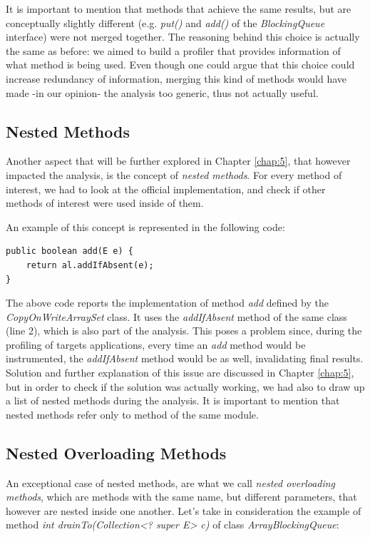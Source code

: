 \documentclass[]{usiinfthesis}
\begin{document}
 \noindent
 It is important to mention that methods that achieve the same results, but are conceptually slightly different (e.g. \textit{put()} and \textit{add()} of the \textit{BlockingQueue} interface) were not merged together. The reasoning behind this choice is actually the same as before: we aimed to build a profiler that provides information of what method is being used. Even though one could argue that this choice could increase redundancy of information, merging this kind of methods would have made -in our opinion- the analysis too generic, thus not actually useful.
 
 \subsection{Nested Methods} \label{sec:4.2.3}
 Another aspect that will be further explored in Chapter \ref{chap:5}, that however impacted the analysis, is the concept of \emph{nested methods}. For every method of interest, we had to look at the official implementation, and check if other methods of interest were used inside of them.
 
 \noindent
 An example of this concept is represented in the following code:
 
\begin{verbatim}
public boolean add(E e) {
    return al.addIfAbsent(e);
}
\end{verbatim}

\noindent
The above code reports the implementation of method \textit{add} defined by the \textit{CopyOnWriteArraySet} class. It uses the \textit{addIfAbsent} method of the same class (line 2), which is also part of the analysis. This poses a problem since, during the profiling of targets applications, every time an \textit{add} method would be instrumented, the \textit{addIfAbsent} method would be as well, invalidating final results. Solution and further explanation of this issue are discussed in Chapter \ref{chap:5}, but in order to check if the solution was actually working, we had also to draw up a list of nested methods during the analysis. It is important to mention that nested methods refer only to method of the same module.

 
 \subsection{Nested Overloading Methods}
 An exceptional case of nested methods, are what we call \textit{nested overloading methods}, which are methods with the same name, but different parameters, that however are nested inside one another. Let's take in consideration the example of method \textit{int drainTo(Collection<? super E> c)} of class \textit{ArrayBlockingQueue}:
 
\end{document}
